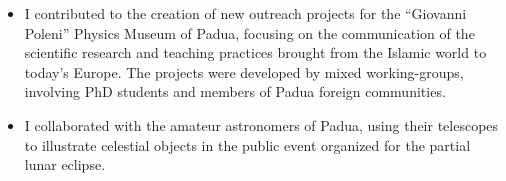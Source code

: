 %
%
%


\begin{experiences}
     {}{
     \begin{itemize}
         \item I contributed to the creation of new outreach projects for the ``Giovanni Poleni'' Physics Museum of Padua, focusing on the communication of the scientific research and teaching practices brought from the Islamic world to today's Europe. The projects were developed by mixed working-groups, involving PhD students and members of Padua foreign communities.
     \end{itemize}}
    \emptySeparator
     {}{
     \begin{itemize}
         \item I collaborated with the amateur astronomers of Padua, using their telescopes to illustrate celestial objects in the public event organized for the partial lunar eclipse.
     \end{itemize}}
\end{experiences}